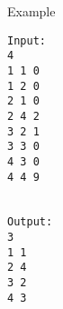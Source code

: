 Example
\begin{verbatim}
Input:
4
1 1 0
1 2 0
2 1 0
2 4 2
3 2 1
3 3 0
4 3 0
4 4 9


Output:
3
1 1
2 4
3 2
4 3

\end{verbatim}